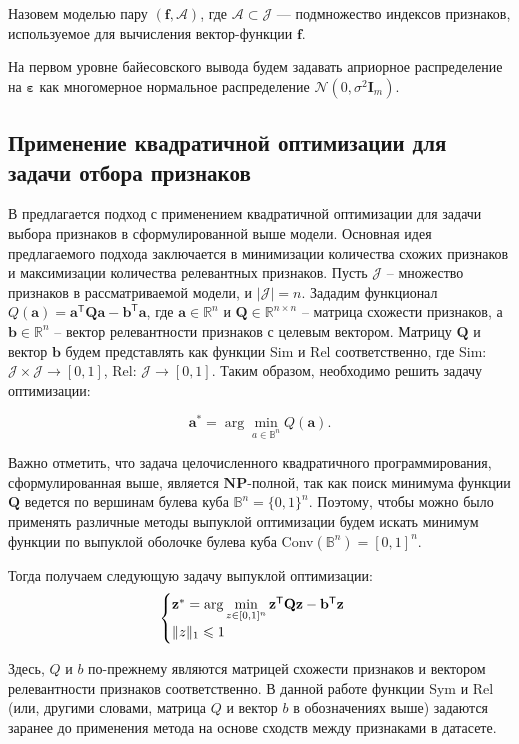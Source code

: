\documentclass[12pt, twoside]{article}
\newcommand{\ba}{\mathbf{a}}
\newcommand{\bz}{\mathbf{z}}
\newcommand{\bfx}{\mathbf{f}}
\newcommand{\bb}{\mathbf{b}}
\newcommand{\bB}{\mathbb{B}}
\newcommand{\bJ}{\mathcal{J}}
\newcommand{\bQ}{\mathbf{Q}}
\newcommand{\beps}{\boldsymbol{\varepsilon}}
\newcommand{\getT}{^{\mathsf{T}}}
\begin{document}
Назовем моделью пару $(\bfx, \mathcal{A})$, где $\mathcal{A} \subset \bJ$ --- подмножество индексов признаков, используемое для вычисления вектор-функции $\bfx$.

На первом уровне байесовского вывода будем задавать априорное распределение на $\beps$ как многомерное нормальное распределение $\mathcal{N}(0, \sigma^2 \mathbf{I}_m).$

\subsection{Применение квадратичной оптимизации для задачи отбора признаков}

В \cite{KatrutsaS17} предлагается подход с применением квадратичной оптимизации для задачи выбора признаков в сформулированной выше модели. Основная идея предлагаемого подхода заключается в минимизации количества схожих признаков и максимизации количества релевантных признаков.
Пусть $\bJ$ -- множество признаков в рассматриваемой модели, и $|\bJ| = n$. 
Зададим функционал $Q(\ba) = \ba \getT \bQ \ba - \bb \getT \ba$, где $\ba \in \mathbb{R}^n$ и $\bQ \in \mathbb{R}^{n \times n}$ -- матрица схожести признаков, а $\bb \in \mathbb{R}^n$ -- вектор релевантности признаков с целевым вектором.
Матрицу $\bQ$ и вектор $\bb$ будем представлять как функции Sim и Rel соответственно, где Sim: $\bJ \times \bJ \rightarrow [0, 1]$, Rel: $\bJ \rightarrow [0, 1]$. Таким образом, необходимо решить задачу оптимизации: 

$$ \ba^* = \arg \min_{a \in \bB^n} Q(\ba).$$

Важно отметить, что задача целочисленного квадратичного программирования, сформулированная выше, является $\mathbf{NP}$-полной, так как поиск минимума функции $\bQ$ ведется по вершинам булева куба $\bB^n = \{0, 1\}^n$. Поэтому, чтобы можно было применять различные методы выпуклой оптимизации будем искать минимум функции по выпуклой оболочке булева куба Conv$(\bB^n) = [0, 1]^n$. 

Тогда получаем следующую задачу выпуклой оптимизации:
\begin{equation*}
\begin{cases}
   $$ \bz^* = \arg \min_{z \in [0, 1]^n}  \bz \getT \bQ \bz - \bb \getT \bz$$  \\
   $$\|z\|_1 \le 1$$
 \end{cases}
 \end{equation*}

Здесь, $Q$ и $b$ по-прежнему являются матрицей схожести признаков и вектором релевантности признаков соответственно. В данной работе функции Sym и Rel (или, другими словами, матрица $Q$ и вектор $b$ в обозначениях выше) задаются заранее до применения метода на основе сходств между признаками в датасете.
\end{document}
